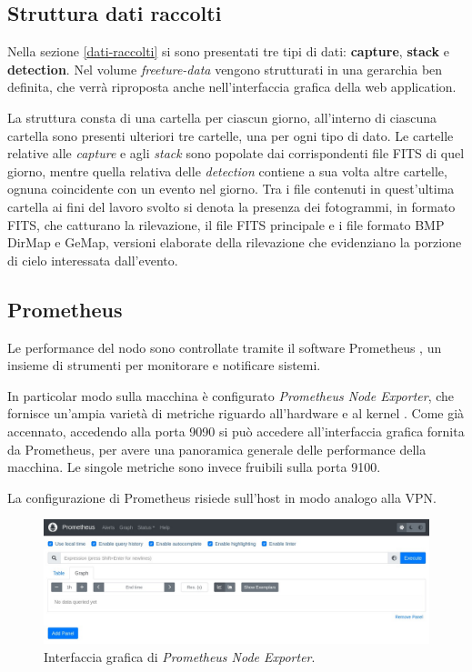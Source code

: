 \subsection{Struttura dati raccolti}

Nella sezione \ref{dati-raccolti} si sono presentati tre tipi di dati: \textbf{capture}, \textbf{stack} e \textbf{detection}. Nel volume \emph{freeture-data} vengono strutturati in una gerarchia ben definita, che verrà riproposta anche nell'interfaccia grafica della web application.

La struttura consta di una cartella per ciascun giorno, all'interno di ciascuna cartella sono presenti ulteriori tre cartelle, una per ogni tipo di dato. Le cartelle relative alle \emph{capture} e agli \emph{stack} sono popolate dai corrispondenti file FITS di quel giorno, mentre quella relativa delle \emph{detection} contiene a sua volta altre cartelle, ognuna coincidente con un evento nel giorno. Tra i file contenuti in quest'ultima cartella ai fini del lavoro svolto si denota la presenza dei fotogrammi, in formato FITS, che catturano la rilevazione, il file FITS principale e i file formato BMP DirMap e GeMap, versioni elaborate della rilevazione che evidenziano la porzione di cielo interessata dall'evento.

\subsection{Prometheus} \label{prometheus}

Le performance del nodo sono controllate tramite il software Prometheus \cite{Prometheus}, un insieme di strumenti per monitorare e notificare sistemi.

In particolar modo sulla macchina è configurato \emph{Prometheus Node Exporter}, che fornisce un'ampia varietà di metriche riguardo all'hardware e al kernel \cite{Prometheus-node-exporter}. Come già accennato, accedendo alla porta 9090 si può accedere all'interfaccia grafica fornita da Prometheus, per avere una panoramica generale delle performance della macchina. Le singole metriche sono invece fruibili sulla porta 9100.

La configurazione di Prometheus risiede sull'host in modo analogo alla VPN.

\begin{figure}[H] 
\includegraphics[width=\textwidth]{images/prometheus-9090.jpg} 
\caption{Interfaccia grafica di \emph{Prometheus Node Exporter}.}
\end{figure}